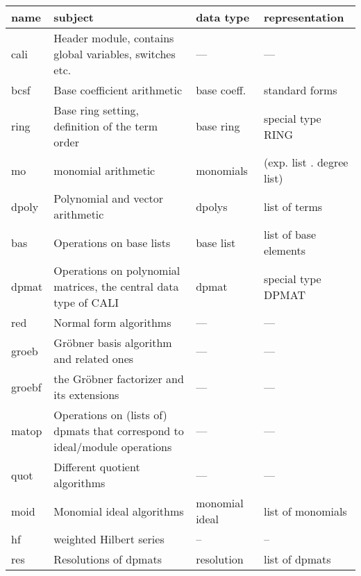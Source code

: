 \documentclass[a4paper,11pt]{article}
\newcommand{\gr}{Gr\"obner}
\begin{document}
\begin{tabular}{|p{1.5cm}||p{5.5cm}|p{2cm}|p{4cm}|}
\hline
\sloppy

name & subject & data type & representation \\
\hline

cali & Header module, contains \linebreak 
global variables, switches etc. & --- & ---\\

bcsf & Base coefficient arithmetic & base coeff. & standard forms \\ 

ring & Base ring setting, definition of the term order & base ring &
special type RING\\

mo & monomial arithmetic & monomials & (exp. list . degree list)\\

dpoly & Polynomial and vector arith\-metic & dpolys & list of terms\\

bas & Operations on base lists & base list & list of base elements \\

dpmat & Operations on polynomial matrices, the central data type of
CALI & dpmat & special type DPMAT\\

red & Normal form algorithms & --- & ---\\

groeb & {\gr} basis algorithm and related ones & --- & ---\\

groebf & the {\gr} factorizer and its extensions  & --- & ---\\

matop & Operations on (lists of) \linebreak dpmats that correspond to
ideal/module operations & --- & ---\\

quot & Different quotient algorithms & --- & --- \\

moid & Monomial ideal algorithms & monomial ideal & list of monomials \\

hf & weighted Hilbert series & -- & -- \\

res & Resolutions of dpmats & resolution & list of dpmats \\


\end{tabular}
\end{document}
